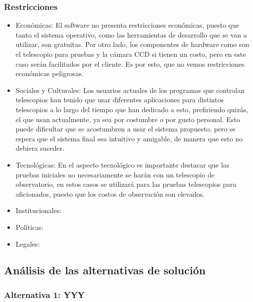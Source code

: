 \documentclass[letterpaper,spanish,10pt]{article}
\begin{document}
\subsubsection{Restricciones}

\begin{itemize}

\item Econ\'omicas: El software no presenta restricciones econ\'omicas, puesto que tanto el sistema operativo, como las herramientas de desarrollo que se van a utilizar, son gratuitas. Por otro lado, los componentes de hardware como son el telescopio para pruebas y la c\'amara CCD si tienen un costo, pero en este caso ser\'an facilitados por el cliente. Es por esto, que no vemos restricciones econ\'omicas peligrosas.

\item Sociales y Culturales: Los usuarios actuales de los programas que controlan telescopios han tenido que usar diferentes aplicaciones para distintos telescopios a lo largo del tiempo que han dedicado a esto, prefiriendo quiz\'as, el que usan actualmente, ya sea por costumbre o por gusto personal. Esto puede dificultar que se acostumbren a usar el sistema propuesto, pero se espera que el sistema final sea intuitivo y amigable, de manera que esto no debiera suceder.

\item Tecnol\'ogicas: En el aspecto tecnol\'ogico es importante destacar que las pruebas iniciales no necesariamente se har\'an con un telescopio de observatorio, en estos casos se utilizar\'a para las pruebas telescopios para aficionados, puesto que los costos de observaci\'on son elevados.

\item Institucionales:

\item Pol\'iticas:

\item Legales:

\end{itemize}

\subsection{An\'alisis de las alternativas de soluci\'on}
\subsubsection{Alternativa 1: YYY}
\end{document}
